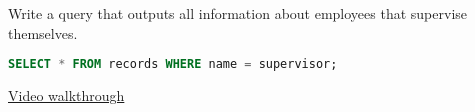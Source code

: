 \question Write a query that outputs all information about employees that supervise themselves.
\begin{solution}[1cm]
\begin{lstlisting}[language=SQL]
SELECT * FROM records WHERE name = supervisor;
\end{lstlisting}
\href{https://youtu.be/GBqEWJKGL2k?t=1m36s}{Video walkthrough}
\end{solution}

